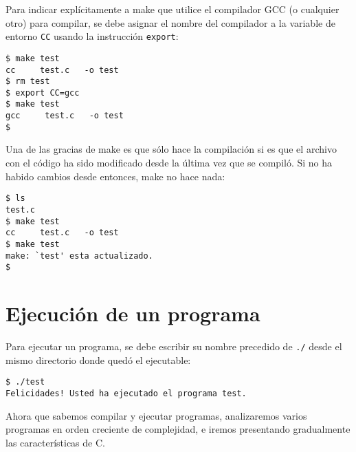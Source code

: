 Para indicar explícitamente a make que utilice el compilador GCC (o
cualquier otro) para compilar, se debe asignar el nombre del compilador
a la variable de entorno \lstinline!CC! usando la instrucción
\lstinline!export!:

\begin{lstlisting}
$ make test
cc     test.c   -o test
$ rm test
$ export CC=gcc
$ make test
gcc     test.c   -o test
$
\end{lstlisting}

Una de las gracias de make es que sólo hace la compilación si es que el
archivo con el código ha sido modificado desde la última vez que se
compiló. Si no ha habido cambios desde entonces, make no hace nada:

\begin{lstlisting}
$ ls
test.c
$ make test
cc     test.c   -o test
$ make test
make: `test' esta actualizado.
$
\end{lstlisting}

\section{Ejecución de un programa}

Para ejecutar un programa, se debe escribir su nombre precedido de
\lstinline!./! desde el mismo directorio donde quedó el ejecutable:

\begin{lstlisting}
$ ./test
Felicidades! Usted ha ejecutado el programa test.
\end{lstlisting}

Ahora que sabemos compilar y ejecutar programas, analizaremos varios
programas en orden creciente de complejidad, e iremos presentando
gradualmente las características de C.
